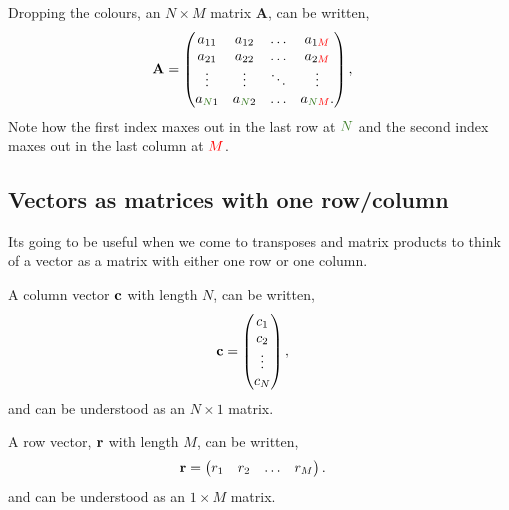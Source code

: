 \documentclass{article}
\newcommand{\A}{\mathbf{A}}
\begin{document}
Dropping the colours, an $N \times M$ matrix $\A$, can be written,
\begin{align}
  \A &= \begin{pmatrix} 
    a_{11} & a_{12} & \hdots & a_{1\M}\\
    a_{21} & a_{22} & \hdots & a_{2\M}\\
    \vdots & \vdots & \ddots & \vdots\\
    a_{\N1} & a_{\N2} & \hdots & a_{\N\M}.
  \end{pmatrix},
\end{align}
Note how the first index maxes out in the last row at $\N$ and the second index maxes out in the last column at $\textcolor{red}{M}$.

\subsection{Vectors as matrices with one row/column}
Its going to be useful when we come to transposes and matrix products to think of a vector as a matrix with either one row or one column.

A column vector $\mathbf{c}$ with length $N$, can be written,
\begin{align}
  \mathbf{c} &= \begin{pmatrix} c_1 \\ c_2 \\ \vdots \\ c_N \end{pmatrix},
\end{align}
and can be understood as an $N\times 1$ matrix.

A row vector, $\mathbf{r}$ with length $M$, can be written,
\begin{align}
  \mathbf{r} &= \begin{pmatrix} r_1 & r_2 & \hdots & r_M \end{pmatrix}.
\end{align}
and can be understood as an $1\times M$ matrix.
\end{document}

